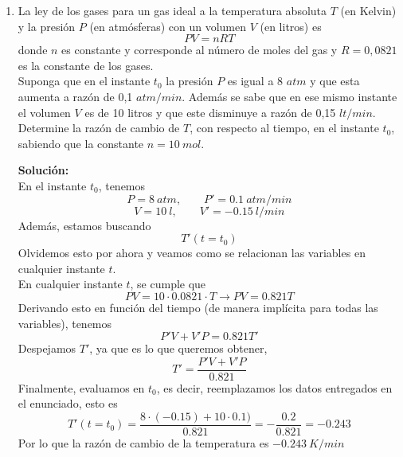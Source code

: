 \documentclass[12pt]{article}
\newenvironment{solucion}
{\begin{mdframed}[backgroundcolor=black!10]
		{\bf Solución:}\\
	}
	{
	\end{mdframed}
}
\newenvironment{preguntas}
{\begin{enumerate}\itemsep12pt
	}
	{
	\end{enumerate}
}
\newcommand{\ra}{\rightarrow}
\newcommand{\lh}{\stackrel{L'H}{=}}
\begin{document}
\begin{preguntas}
\begin{solucion}
Por último, buscamos asíntotas oblicuas con
$$m = 
\lim\limits_{x \ra \pm \infty} \dfrac{f(x)}{x} =
\lim\limits_{x \ra \pm \infty} \dfrac{xe^{1/x}}{x} =
\lim\limits_{x \ra \pm \infty} e^{1/x} =
1$$
$$n = 
\lim\limits_{x \ra \pm \infty} f(x) - mx =
\lim\limits_{x \ra \pm \infty} xe^{1/x} - x =
\lim\limits_{x \ra \pm \infty} x(e^{1/x} - 1) =
\lim\limits_{x \ra \pm \infty} \dfrac{e^{1/x} - 1}{\dfrac{1}{x}}$$
$$\lh
\lim\limits_{x \ra \pm \infty} \dfrac{-\dfrac{e^{1/x}}{x^2}}{-\dfrac{1}{x^2}} =
\lim\limits_{x \ra \pm \infty} e^{1/x} = 1
$$
Por lo que $y = x + 1$ es asíntota oblicua.
\end{solucion}
\item La ley de los gases para un gas ideal a la temperatura absoluta $T$ (en Kelvin) y la presión $P$ (en atmósferas) con un volumen $V$ (en litros) es
$$PV = nRT$$
donde $n$ es constante y corresponde al número de moles del gas y $R = 0,0821$ es la constante de los gases.\\
Suponga que en el instante $t_0$ la presión $P$ es igual a 8 $atm$ y que esta aumenta a razón de 0,1 $atm/min$. Además se sabe que en ese mismo instante el volumen $V$ es de 10 litros y que este disminuye a razón de 0,15 $lt/min$.\\
Determine la razón de cambio de $T$, con respecto al tiempo, en el instante $t_0$, sabiendo que la constante $n = 10\ mol$.
\begin{solucion}
En el instante $t_0$, tenemos
$$P = 8\ atm, \qquad P' = 0.1\ atm/min$$
$$V = 10\ l, \qquad V' = -0.15\ l/min$$
Además, estamos buscando
$$T'(t=t_0)$$
Olvidemos esto por ahora y veamos como se relacionan las variables en cualquier instante $t$.\\

En cualquier instante $t$, se cumple que
$$PV = 10 \cdot 0.0821 \cdot T \ra PV = 0.821 T $$
Derivando esto en función del tiempo (de manera implícita para todas las variables), tenemos
$$P'V + V'P = 0.821T'$$
Despejamos $T'$, ya que es lo que queremos obtener,
$$T' = \dfrac{P'V + V'P}{0.821}$$
Finalmente, evaluamos en $t_0$, es decir, reemplazamos los datos entregados en el enunciado, esto es
$$T'(t=t_0) = \dfrac{8 \cdot (-0.15) + 10 \cdot 0.1)}{0.821} = -\dfrac{0.2}{0.821} = -0.243$$
Por lo que la razón de cambio de la temperatura es $-0.243\ K/min$
\end{solucion}
\end{preguntas}
\end{document}

